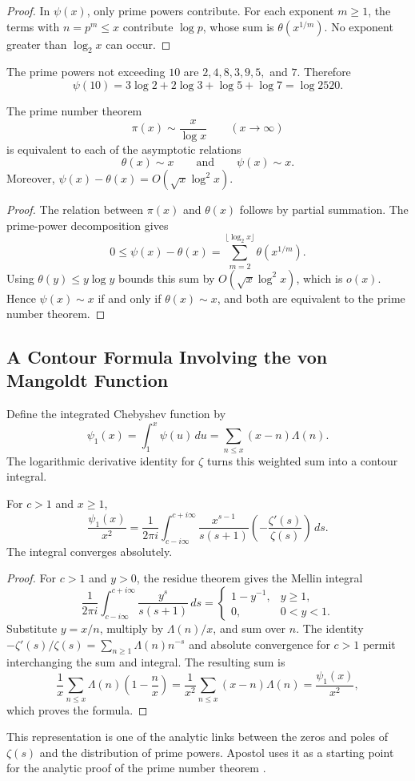 \begin{proof}
In $\psi(x)$, only prime powers contribute. For each exponent $m\geq1$, the terms with $n=p^m\leq x$ contribute $\log p$, whose sum is $\theta(x^{1/m})$. No exponent greater than $\log_2x$ can occur.
\end{proof}

\begin{example}
The prime powers not exceeding $10$ are $2,4,8,3,9,5,$ and $7$. Therefore
\[
 \psi(10)=3\log2+2\log3+\log5+\log7=\log2520.
\]
\end{example}

\begin{theorem}
The prime number theorem
\[
 \pi(x)\sim\frac{x}{\log x}\qquad(x\to\infty)
\]
 is equivalent to each of the asymptotic relations
\[
 \theta(x)\sim x
 \qquad\text{and}\qquad
 \psi(x)\sim x.
\]
Moreover, $\psi(x)-\theta(x)=O(\sqrt{x}\log^2x)$.
\end{theorem}

\begin{proof}
The relation between $\pi(x)$ and $\theta(x)$ follows by partial summation. The prime-power decomposition gives
\[
 0\leq\psi(x)-\theta(x)
 =\sum_{m=2}^{\lfloor\log_2x\rfloor}\theta(x^{1/m}).
\]
Using $\theta(y)\leq y\log y$ bounds this sum by $O(\sqrt{x}\log^2x)$, which is $o(x)$. Hence $\psi(x)\sim x$ if and only if $\theta(x)\sim x$, and both are equivalent to the prime number theorem.
\end{proof}

\subsection{A Contour Formula Involving the von Mangoldt Function}

Define the integrated Chebyshev function by
\[
 \psi_1(x)=\int_1^x\psi(u)\,du
 =\sum_{n\leq x}(x-n)\Lambda(n).
\]
The logarithmic derivative identity for $\zeta$ turns this weighted sum into a contour integral.

\begin{theorem}
For $c>1$ and $x\geq1$,
\[
 \frac{\psi_1(x)}{x^2}
 =\frac{1}{2\pi i}\int_{c-i\infty}^{c+i\infty}
 \frac{x^{s-1}}{s(s+1)}\left(-\frac{\zeta'(s)}{\zeta(s)}\right)\,ds.
\]
The integral converges absolutely.
\end{theorem}

\begin{proof}
For $c>1$ and $y>0$, the residue theorem gives the Mellin integral
\[
 \frac{1}{2\pi i}\int_{c-i\infty}^{c+i\infty}
 \frac{y^s}{s(s+1)}\,ds
 =\begin{cases}
 1-y^{-1},&y\geq1,\\
 0,&0<y<1.
 \end{cases}
\]
Substitute $y=x/n$, multiply by $\Lambda(n)/x$, and sum over $n$. The identity $-\zeta'(s)/\zeta(s)=\sum_{n\geq1}\Lambda(n)n^{-s}$ and absolute convergence for $c>1$ permit interchanging the sum and integral. The resulting sum is
\[
 \frac{1}{x}\sum_{n\leq x}\Lambda(n)\left(1-\frac{n}{x}\right)
 =\frac{1}{x^2}\sum_{n\leq x}(x-n)\Lambda(n)
 =\frac{\psi_1(x)}{x^2},
\]
which proves the formula.
\end{proof}

This representation is one of the analytic links between the zeros and poles of $\zeta(s)$ and the distribution of prime powers. Apostol uses it as a starting point for the analytic proof of the prime number theorem \cite[Chapter 13]{Apostol1976-xj}.